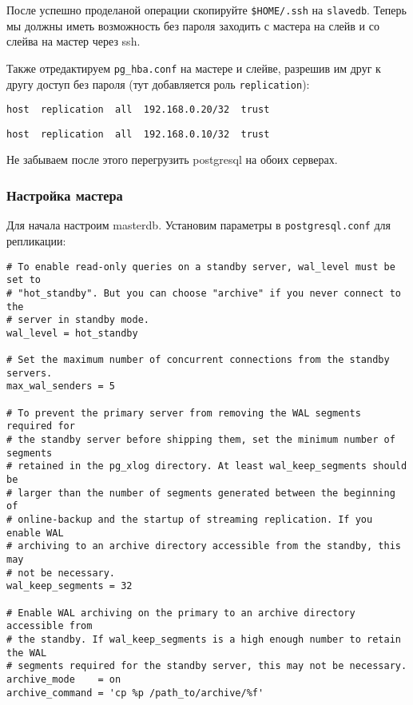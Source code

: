 После успешно проделаной операции скопируйте \lstinline!$HOME/.ssh! на \lstinline!slavedb!. Теперь мы должны иметь возможность без пароля заходить с мастера на слейв и со слейва на мастер через ssh.

Также отредактируем \lstinline!pg_hba.conf! на мастере и слейве, разрешив им друг к другу доступ без пароля (тут добавляется роль \lstinline!replication!):

\begin{lstlisting}[label=lst:streaming7,caption=Мастер pg\_hba.conf]
host  replication  all  192.168.0.20/32  trust
\end{lstlisting}

\begin{lstlisting}[label=lst:streaming8,caption=Слейв pg\_hba.conf]
host  replication  all  192.168.0.10/32  trust
\end{lstlisting}

Не забываем после этого перегрузить postgresql на обоих серверах.

\subsubsection{Настройка мастера}

Для начала настроим masterdb. Установим параметры в \lstinline!postgresql.conf! для репликации:

\begin{lstlisting}[label=lst:streaming9,caption=Настройка мастера]
# To enable read-only queries on a standby server, wal_level must be set to
# "hot_standby". But you can choose "archive" if you never connect to the
# server in standby mode.
wal_level = hot_standby

# Set the maximum number of concurrent connections from the standby servers.
max_wal_senders = 5

# To prevent the primary server from removing the WAL segments required for
# the standby server before shipping them, set the minimum number of segments
# retained in the pg_xlog directory. At least wal_keep_segments should be
# larger than the number of segments generated between the beginning of
# online-backup and the startup of streaming replication. If you enable WAL
# archiving to an archive directory accessible from the standby, this may
# not be necessary.
wal_keep_segments = 32

# Enable WAL archiving on the primary to an archive directory accessible from
# the standby. If wal_keep_segments is a high enough number to retain the WAL
# segments required for the standby server, this may not be necessary.
archive_mode    = on
archive_command = 'cp %p /path_to/archive/%f'
\end{lstlisting}

